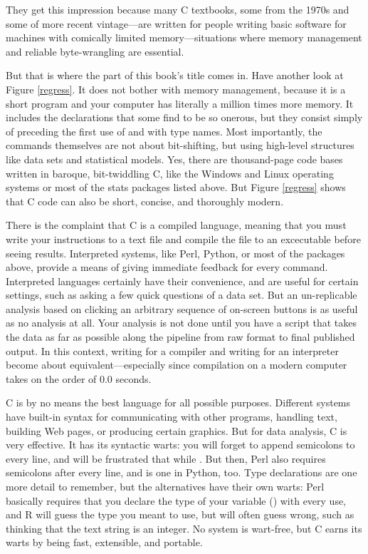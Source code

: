 They get this impression because many C textbooks, some from the 1970s
and some of more recent vintage---are written for people writing basic
software for machines with comically limited memory---situations where
memory management and reliable byte-wrangling are essential.

But that is where the  part of this book's title comes
in. Have another look at Figure \ref{regress}.  It does not bother with
memory management, because it is a short program and your computer has
literally a million times more memory. It includes the declarations
that some find to be so onerous, but they consist simply of preceding
the first use of  and  with type names.
Most importantly, the commands themselves are not
about bit-shifting, but using high-level structures like data sets and
statistical models.  Yes, there are thousand-page code bases written in
baroque, bit-twiddling C, like the Windows and Linux operating systems
or most of the stats packages listed above. But Figure \ref{regress}
shows that C code can also be short, concise, and thoroughly modern.

There is the complaint that C is a compiled language, meaning that
you must write your instructions to a text file and compile the file
to an excecutable before seeing results. Interpreted systems,
like Perl, Python, or most of the packages above, provide a means of
giving immediate feedback for every command. Interpreted languages
certainly have their convenience, and are useful for certain settings,
such as asking a few quick questions of a data set. But an un-replicable
analysis based on clicking an arbitrary sequence of on-screen buttons
is as useful as no analysis at all.  Your analysis is not done until you
have a script that takes the data as far as possible along the pipeline
from raw format to final published output. In this context, writing  for
a compiler and writing  for an interpreter become about
equivalent---especially since compilation on a modern computer takes on
the order of 0.0 seconds.

C is by no means the best language for all possible purposes.
Different systems have built-in syntax for communicating with other programs, 
handling text, building Web pages, or producing certain graphics. But
for data analysis, C is very effective. It has its syntactic warts: you
will forget to append semicolons to every line, and will be frustrated
that  while . But then,
Perl also requires semicolons after every line, and  is one in
Python, too. Type declarations are one more detail to remember,
but the alternatives have their own warts: Perl basically requires that
you declare the type of your variable () with every use,
and R will guess the type you meant to use, but will often guess wrong,
such as thinking that the text string  is an integer. No system is
wart-free, but C earns its warts by being fast, extensible, and portable.

